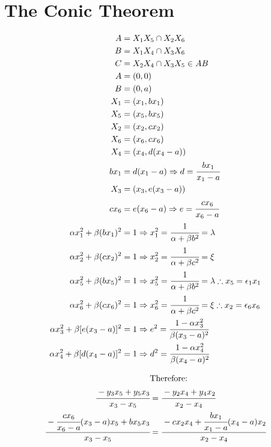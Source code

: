 \documentclass[12pt]{article}
\numberwithin{table}{section}
\begin{document}




\section{The Conic Theorem}

\begin{align}
A &= X_1 X_5 \cap X_2 X_6 \\
B &= X_1 X_4 \cap X_3 X_6 \\
C &= X_2 X_4 \cap X_3 X_5 \in AB \label{eq3} \\
A &= (0,0) \\
B &= (0,a) \\
X_1 &= (x_1, bx_1) \\
X_5 &= (x_5, bx_5) \\
X_2 &= (x_2, cx_2) \\
X_6 &= (x_6, cx_6) \\
X_4 &= (x_4, d(x_4 - a)) \\
bx_1 &= d(x_1 - a) \Rightarrow d = \cfrac{b x_1}{x_1 - a} \\
X_3 &= (x_3, e(x_3 - a)) \\
cx_6 &= e(x_6 - a) \Rightarrow e = \cfrac{cx_6}{x_6 - a} \\
\alpha x_1^2 + \beta (bx_1)^2 &= 1 \Rightarrow x_1^2 = \cfrac{1}{\alpha + \beta b^2} = \lambda \\
\alpha x_2^2 + \beta (cx_2)^2 &= 1 \Rightarrow  x_2^2 =\cfrac{1}{\alpha + \beta c^2} = \xi\\  
\alpha x_5^2 + \beta (bx_5)^2 &= 1\Rightarrow x_5^2 = \cfrac{1}{\alpha + \beta b^2} = \lambda \therefore x_5 = \epsilon_1 x_1 \\
\alpha x_6^2 + \beta (cx_6)^2 &= 1 \Rightarrow  x_6^2 =\cfrac{1}{\alpha + \beta c^2} = \xi \therefore x_2 = \epsilon_6 x_6\\
\alpha x_3^2 + \beta [e(x_3-a)]^2 &= 1 \Rightarrow e^2 = \cfrac{1 - \alpha x_3^2 }{\beta (x_3-a)^2} \label{eq18}\\
\alpha x_4^2 + \beta [d(x_4-a)]^2 &= 1 \Rightarrow d^2 = \cfrac{1 - \alpha x_4^2 }{\beta (x_4-a)^2} \label{eq19}
\end{align}

\begin{align}
&\text{Therefore:} \nonumber \\
\cfrac{-y_3 x_5 + y_5 x_3}{x_3 - x_5} &= \cfrac{-y_2 x_4 + y_4 x_2}{x_2 - x_4} \label{eq20} \\
\cfrac{-\cfrac{cx_6}{x_6 - a}(x_3-a) x_5 + b x_5 x_3}{x_3 - x_5} &= \cfrac{-cx_2 x_4 + \cfrac{bx_1}{x_1 - a}(x_4-a) x_2}{x_2 - x_4} 
\end{align}
\end{document}
